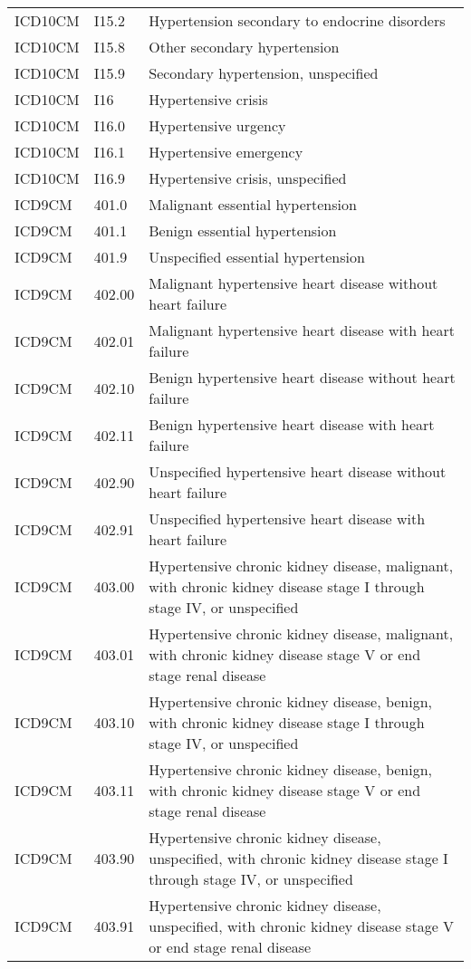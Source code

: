 \begin{longtable}{p{}p{}p{}}
  ICD10CM & I15.2 & Hypertension secondary to endocrine disorders \\ 
  ICD10CM & I15.8 & Other secondary hypertension \\ 
  ICD10CM & I15.9 & Secondary hypertension, unspecified \\ 
  ICD10CM & I16 & Hypertensive crisis \\ 
  ICD10CM & I16.0 & Hypertensive urgency \\ 
  ICD10CM & I16.1 & Hypertensive emergency \\ 
  ICD10CM & I16.9 & Hypertensive crisis, unspecified \\ 
  ICD9CM & 401.0 & Malignant essential hypertension \\ 
  ICD9CM & 401.1 & Benign essential hypertension \\ 
  ICD9CM & 401.9 & Unspecified essential hypertension \\ 
  ICD9CM & 402.00 & Malignant hypertensive heart disease without heart failure \\ 
  ICD9CM & 402.01 & Malignant hypertensive heart disease with heart failure \\ 
  ICD9CM & 402.10 & Benign hypertensive heart disease without heart failure \\ 
  ICD9CM & 402.11 & Benign hypertensive heart disease with heart failure \\ 
  ICD9CM & 402.90 & Unspecified hypertensive heart disease without heart failure \\ 
  ICD9CM & 402.91 & Unspecified hypertensive heart disease with heart failure \\ 
  ICD9CM & 403.00 & Hypertensive chronic kidney disease, malignant, with chronic kidney disease stage I through stage IV, or unspecified \\ 
  ICD9CM & 403.01 & Hypertensive chronic kidney disease, malignant, with chronic kidney disease stage V or end stage renal disease \\ 
  ICD9CM & 403.10 & Hypertensive chronic kidney disease, benign, with chronic kidney disease stage I through stage IV, or unspecified \\ 
  ICD9CM & 403.11 & Hypertensive chronic kidney disease, benign, with chronic kidney disease stage V or end stage renal disease \\ 
  ICD9CM & 403.90 & Hypertensive chronic kidney disease, unspecified, with chronic kidney disease stage I through stage IV, or unspecified \\ 
  ICD9CM & 403.91 & Hypertensive chronic kidney disease, unspecified, with chronic kidney disease stage V or end stage renal disease \\ 

\end{longtable}
